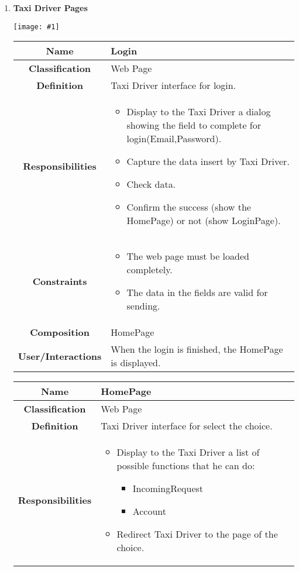 \documentclass[11pt, a4paper,titlepage]{article}
\newcommand{\image}[1]{
	\begin{center}
		\noindent \texttt{[image: \#1]}
	\end{center}
	}
\begin{document}
\begin{enumerate}
\newpage
\item \textbf{Taxi Driver Pages}\\
\image{page_taxidriver.png}
\begin{tabularx}{\textwidth}{| c | X |}
	\hline
	\textbf{Name} &
	Login
	\\
	\hline
	\textbf{Classification} &
	Web Page
	\\
	\hline
	\textbf{Definition} &
	Taxi Driver interface for login.\\
	\hline
	\textbf{Responsibilities} &
	\begin{itemize}
		\item Display to the Taxi Driver a dialog showing the field to complete for login(Email,Password).
		\item Capture the data insert by Taxi Driver.	
		\item Check data.    	
		\item Confirm the success (show the HomePage) or not (show LoginPage).	
	\end{itemize}
	\\
	\hline
	\textbf{Constraints} &
	\begin{itemize}
		\item The web page must be loaded completely.
		\item The data in the fields are valid for sending.
	\end{itemize}
	\\
	\hline
	\textbf{Composition} & HomePage
	\\
	\hline
	\textbf{User/Interactions} & When the login is finished, the HomePage is displayed.
	\\
	\hline 
\end{tabularx}
\begin{tabularx}{\textwidth}{| c | X |}
	\hline
	\textbf{Name} &
	HomePage
	\\
	\hline
	\textbf{Classification} &
	Web Page
	\\
	\hline
	\textbf{Definition} &
	Taxi Driver interface for select the choice.\\
	\hline
	\textbf{Responsibilities} &
	\begin{itemize}
		\item Display to the Taxi Driver a list of possible functions that he can do:
		\begin{itemize}
			\item IncomingRequest
			\item Account
		\end{itemize}
		\item Redirect Taxi Driver to the page of the choice.

\end{itemize}
\end{tabularx}
\end{enumerate}
\end{document}
